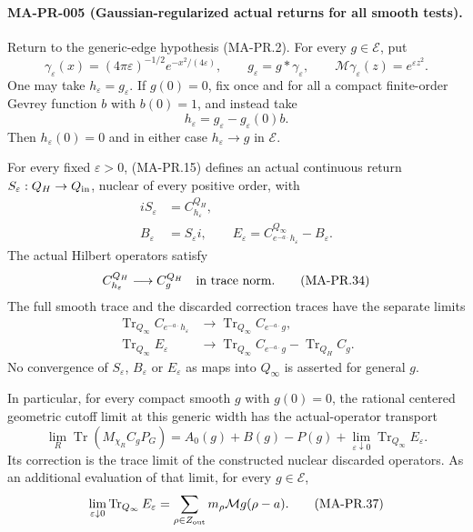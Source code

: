 \paragraph{MA-PR-005 (Gaussian-regularized actual returns for all smooth tests).}
Return to the generic-edge hypothesis (MA-PR.2).
For every $g\in\mathcal E$, put
\[
 \gamma_\varepsilon(x)
       =(4\pi\varepsilon)^{-1/2}e^{-x^2/(4\varepsilon)},
 \qquad g_\varepsilon=g*\gamma_\varepsilon,\qquad
                \mathcal M\gamma_\varepsilon(z)=e^{\varepsilon z^2}.
\tag{MA-PR.31}
\]
One may take $h_\varepsilon=g_\varepsilon$.
If $g(0)=0$, fix once and for all a compact finite-order
Gevrey function $b$ with $b(0)=1$, and instead take
\[
       h_\varepsilon
            =g_\varepsilon-g_\varepsilon(0)b .
\tag{MA-PR.32}
\]
Then $h_\varepsilon(0)=0$ and in either case
$h_\varepsilon\to g$ in $\mathcal E$.

For every fixed $\varepsilon>0$, (MA-PR.15) defines
an actual continuous return
$S_\varepsilon:Q_H\to Q_{\rm in}$, nuclear of every
positive order, with
\[
\begin{aligned}
 iS_\varepsilon&=C_{h_\varepsilon}^{Q_H},\\
 B_\varepsilon&=S_\varepsilon i,\qquad
 E_\varepsilon
   =C_{e^{-a\cdot}h_\varepsilon}^{Q_\infty}-B_\varepsilon .
\end{aligned}
\tag{MA-PR.33}
\]
The actual Hilbert operators satisfy
\[
       C_{h_\varepsilon}^{Q_H}
                \longrightarrow C_g^{Q_H}
                           \quad\hbox{in trace norm}.
\tag{MA-PR.34}
\]
The full smooth trace and the discarded correction traces
have the separate limits
\[
\begin{aligned}
 \operatorname{Tr}_{Q_\infty}
       C_{e^{-a\cdot}h_\varepsilon}
     &\longrightarrow
       \operatorname{Tr}_{Q_\infty}C_{e^{-a\cdot}g},\\
 \operatorname{Tr}_{Q_\infty}E_\varepsilon
     &\longrightarrow
        \operatorname{Tr}_{Q_\infty}C_{e^{-a\cdot}g}
                     -\operatorname{Tr}_{Q_H}C_g .
\end{aligned}
\tag{MA-PR.35}
\]
No convergence of $S_\varepsilon$, $B_\varepsilon$
or $E_\varepsilon$ as maps into $Q_\infty$ is
asserted for general $g$.

In particular, for every compact smooth $g$ with $g(0)=0$,
the rational centered geometric cutoff limit at this
generic width has the actual-operator transport
\[
 \lim_R\operatorname{Tr}(M_{\chi_R}C_gP_G)
     =A_0(g)+B(g)-P(g)
             +\lim_{\varepsilon\downarrow0}
                         \operatorname{Tr}_{Q_\infty}E_\varepsilon .
\tag{MA-PR.36}
\]
Its correction is the trace limit of the constructed
nuclear discarded operators.  As an additional
evaluation of that limit, for every $g\in\mathcal E$,
\[
 \lim_{\varepsilon\downarrow0}
             \operatorname{Tr}_{Q_\infty}E_\varepsilon
       =\sum_{\rho\in Z_{\rm out}}
                              m_\rho\mathcal Mg(\rho-a).
\tag{MA-PR.37}
\]

